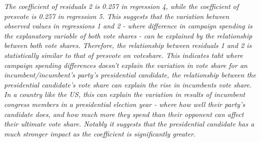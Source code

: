 \documentclass[12pt,letterpaper]{article}
\begin{document}
\begin{enumerate}
		\textit{The coefficient of residuals 2 is 0.257 in regression 4, while the coefficient of presvote is 0.257 in regression 5. This suggests that the variation between observed values in regressions 1 and 2 - where difference in campaign spending is the explanatory variable of both vote shares - can be explained by the relationship between both vote shares. Therefore, the relationship between residuals 1 and 2 is statistically similar to that of presvote on voteshare. This indicates taht where campaign spending differences doesn't explain the variation in vote share for an incumbent/incumbent's party's presidential candidate, the relationship between the presidential candidate's vote share can explain the rise in incumbents vote share. In a country like the US, this can explain the variation in results of incumbent congress members in a presidential election year - where how well their party's candidate does, and how much more they spend than their opponent can affect their ultimate vote share. Notably it suggests that the presidential candidate has a much stronger impact as the coefficient is significantly greater.}
		
		\vspace{.5cm}
		
		\end{enumerate}
\end{document}
